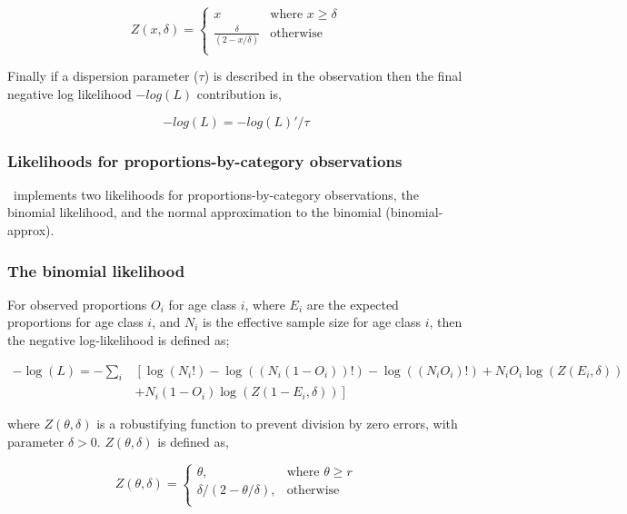 \[ Z(x,\delta) =
\begin{cases}
x       & \text{where } x \geq \delta\\
\frac{\delta}{(2 - x / \delta)}  & \text{otherwise}\\
\end{cases}
\]

Finally if a dispersion parameter ($\tau$) is described in the observation then the final negative log likelihood $-log(L)$ contribution is,

$$-log(L) = -log(L)' / \tau$$


\subsubsection{Likelihoods for proportions-by-category observations}
\CNAME\ implements two likelihoods for proportions-by-category observations, the binomial likelihood, and the normal approximation to the binomial (binomial-approx). 

\subsubsection*{The binomial likelihood}

For observed proportions $O_i$ for age class $i$, where $E_i$ are the expected proportions for age class $i$, and $N_i$ is the effective sample size for age class $i$, then the negative log-likelihood is defined as;  

\begin{equation}
\begin{split}
-\log \left(L \right)= -\sum\limits_i & \left[ \right. \log \left(N_i! \right) - \log \left(\left(N_i \left(1 - O_i \right) \right)! \right) - \log \left(\left(N_i O_i \right)! \right) + N_i O_i \log \left(Z\left(E_i,\delta \right) \right) \\
&+ N_i \left(1 - O_i \right)\log \left(Z\left(1 - E_i,\delta\right) \right) \left. \right]
\end{split}
\end{equation}


where $Z \left(\theta,\delta \right)$ is a robustifying function to prevent division by zero errors, with parameter $\delta>0$. $Z \left(\theta,\delta \right)$ is defined as,

\begin{equation}
Z \left(\theta,\delta \right) = \begin{cases}
\theta, & \text{where $\theta \ge r$} \\
\delta/\left( 2-\theta/\delta \right), & \text{otherwise} \\  
\end{cases}
\end{equation}


